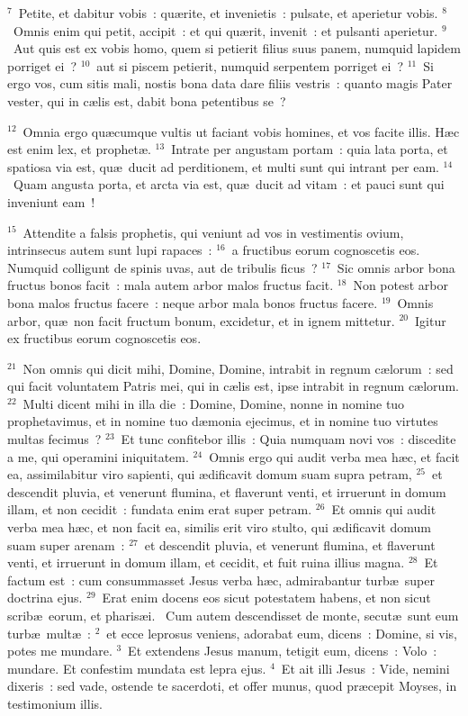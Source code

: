 ${}^{7}$~Petite, et dabitur vobis~: qu\ae rite, et invenietis~: pulsate, et aperietur vobis.
${}^{8}$~Omnis enim qui petit, accipit~: et qui qu\ae rit, invenit~: et pulsanti aperietur.
${}^{9}$~Aut quis est ex vobis homo, quem si petierit filius suus panem, numquid lapidem porriget ei~?
${}^{10}$~aut si piscem petierit, numquid serpentem porriget ei~?
${}^{11}$~Si ergo vos, cum sitis mali, nostis bona data dare filiis vestris~: quanto magis Pater vester, qui in c\ae lis est, dabit bona petentibus se~?


${}^{12}$~Omnia ergo qu\ae cumque vultis ut faciant vobis homines, et vos facite illis. H\ae c est enim lex, et prophet\ae .
${}^{13}$~Intrate per angustam portam~: quia lata porta, et spatiosa via est, qu\ae\ ducit ad perditionem, et multi sunt qui intrant per eam.
${}^{14}$~Quam angusta porta, et arcta via est, qu\ae\ ducit ad vitam~: et pauci sunt qui inveniunt eam~!


${}^{15}$~Attendite a falsis prophetis, qui veniunt ad vos in vestimentis ovium, intrinsecus autem sunt lupi rapaces~:
${}^{16}$~a fructibus eorum cognoscetis eos. Numquid colligunt de spinis uvas, aut de tribulis ficus~?
${}^{17}$~Sic omnis arbor bona fructus bonos facit~: mala autem arbor malos fructus facit.
${}^{18}$~Non potest arbor bona malos fructus facere~: neque arbor mala bonos fructus facere.
${}^{19}$~Omnis arbor, qu\ae\ non facit fructum bonum, excidetur, et in ignem mittetur.
${}^{20}$~Igitur ex fructibus eorum cognoscetis eos.


${}^{21}$~Non omnis qui dicit mihi, Domine, Domine, intrabit in regnum c\ae lorum~: sed qui facit voluntatem Patris mei, qui in c\ae lis est, ipse intrabit in regnum c\ae lorum.
${}^{22}$~Multi dicent mihi in illa die~: Domine, Domine, nonne in nomine tuo prophetavimus, et in nomine tuo d\ae monia ejecimus, et in nomine tuo virtutes multas fecimus~?
${}^{23}$~Et tunc confitebor illis~: Quia numquam novi vos~: discedite a me, qui operamini iniquitatem.
${}^{24}$~Omnis ergo qui audit verba mea h\ae c, et facit ea, assimilabitur viro sapienti, qui \ae dificavit domum suam supra petram,
${}^{25}$~et descendit pluvia, et venerunt flumina, et flaverunt venti, et irruerunt in domum illam, et non cecidit~: fundata enim erat super petram.
${}^{26}$~Et omnis qui audit verba mea h\ae c, et non facit ea, similis erit viro stulto, qui \ae dificavit domum suam super arenam~:
${}^{27}$~et descendit pluvia, et venerunt flumina, et flaverunt venti, et irruerunt in domum illam, et cecidit, et fuit ruina illius magna.
${}^{28}$~Et factum est~: cum consummasset Jesus verba h\ae c, admirabantur turb\ae\ super doctrina ejus.
${}^{29}$~Erat enim docens eos sicut potestatem habens, et non sicut scrib\ae\ eorum, et pharis\ae i.
~Cum autem descendisset de monte, secut\ae\ sunt eum turb\ae\ mult\ae~:
${}^{2}$~et ecce leprosus veniens, adorabat eum, dicens~: Domine, si vis, potes me mundare.
${}^{3}$~Et extendens Jesus manum, tetigit eum, dicens~: Volo~: mundare. Et confestim mundata est lepra ejus.
${}^{4}$~Et ait illi Jesus~: Vide, nemini dixeris~: sed vade, ostende te sacerdoti, et offer munus, quod pr\ae cepit Moyses, in testimonium illis.


